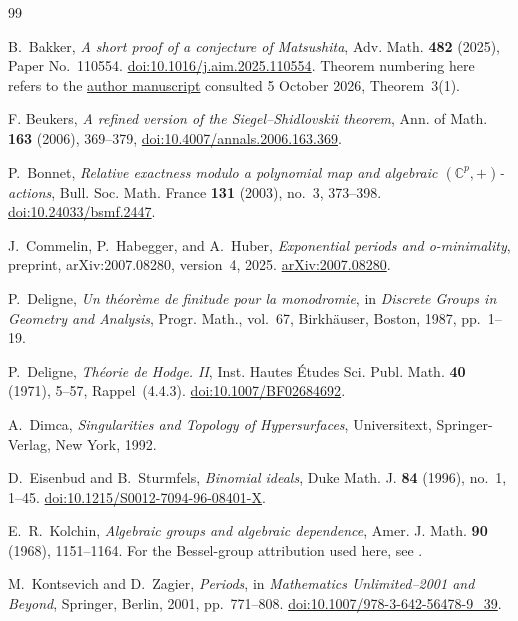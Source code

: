\documentclass[11pt]{article}
\numberwithin{equation}{section}
\theoremstyle{definition}
\theoremstyle{remark}
\begin{document}
\small
\begin{thebibliography}{99}

B.~Bakker,
\emph{A short proof of a conjecture of Matsushita},
Adv. Math. \textbf{482} (2025), Paper No.~110554.
\href{https://doi.org/10.1016/j.aim.2025.110554}{doi:10.1016/j.aim.2025.110554}.
Theorem numbering here refers to the
\href{https://benjamin-bakker.github.io/matsushita.pdf}{author manuscript}
consulted 5 October 2026, Theorem~3(1).

F. Beukers, \emph{A refined version of the Siegel--Shidlovskii theorem},
Ann. of Math. \textbf{163} (2006), 369--379,
\href{https://doi.org/10.4007/annals.2006.163.369}{doi:10.4007/annals.2006.163.369}.

P.~Bonnet,
\emph{Relative exactness modulo a polynomial map and algebraic
$(\mathbb C^p,+)$-actions},
Bull. Soc. Math. France \textbf{131} (2003), no.~3, 373--398.
\href{https://doi.org/10.24033/bsmf.2447}{doi:10.24033/bsmf.2447}.

J.~Commelin, P.~Habegger, and A.~Huber,
\emph{Exponential periods and o-minimality},
preprint, arXiv:2007.08280, version~4, 2025.
\href{https://arxiv.org/abs/2007.08280}{arXiv:2007.08280}.

P.~Deligne,
\emph{Un th\'eor\`eme de finitude pour la monodromie},
in \emph{Discrete Groups in Geometry and Analysis},
Progr. Math., vol.~67, Birkh\"auser, Boston, 1987, pp.~1--19.

P.~Deligne,
\emph{Th\'eorie de Hodge. II},
Inst. Hautes \'Etudes Sci. Publ. Math. \textbf{40} (1971), 5--57,
Rappel~(4.4.3).
\href{https://doi.org/10.1007/BF02684692}{doi:10.1007/BF02684692}.

A.~Dimca,
\emph{Singularities and Topology of Hypersurfaces},
Universitext, Springer-Verlag, New York, 1992.

D.~Eisenbud and B.~Sturmfels,
\emph{Binomial ideals},
Duke Math. J. \textbf{84} (1996), no.~1, 1--45.
\href{https://doi.org/10.1215/S0012-7094-96-08401-X}{doi:10.1215/S0012-7094-96-08401-X}.

E.~R.~Kolchin,
\emph{Algebraic groups and algebraic dependence},
Amer. J. Math. \textbf{90} (1968), 1151--1164.
For the Bessel-group attribution used here, see
\cite[Example~1.3.32 and reference \textnormal{[Kol68]}]{Singer}.

M.~Kontsevich and D.~Zagier,
\emph{Periods},
in \emph{Mathematics Unlimited--2001 and Beyond},
Springer, Berlin, 2001, pp.~771--808.
\href{https://doi.org/10.1007/978-3-642-56478-9_39}{doi:10.1007/978-3-642-56478-9\_39}.


\end{thebibliography}
\end{document}
